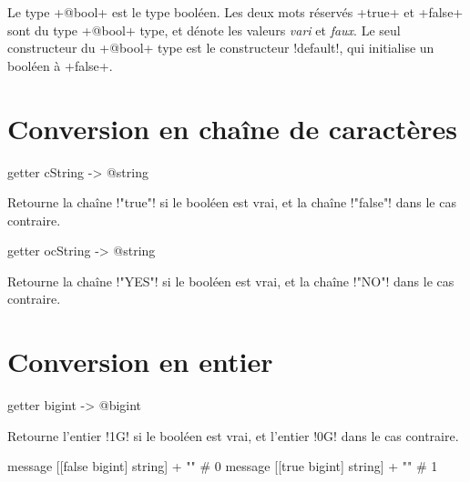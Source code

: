 



Le type \ggsq+@bool+ est le type booléen. Les deux mots réservés \ggsq+true+ et \ggsq+false+ sont du type \ggsq+@bool+ type, et dénote les valeurs \emph{vari} et \emph{faux}. Le seul constructeur du \ggsq+@bool+ type est le constructeur \ggsq!default!, qui initialise un booléen à \ggsq+false+.


\section{Conversion en chaîne de caractères}


\begin{galgas4box}
getter cString -> @string
\end{galgas4box}

Retourne la chaîne \ggsq!"true"! si le booléen est vrai, et la chaîne \ggsq!"false"! dans le cas contraire.








\begin{galgas4box}
getter ocString -> @string
\end{galgas4box}

Retourne la chaîne \ggsq!"YES"! si le booléen est vrai, et la chaîne \ggsq!"NO"! dans le cas contraire.




\section{Conversion en entier}



\begin{galgas4box}
getter bigint -> @bigint
\end{galgas4box}

Retourne l'entier \ggsq!1G! si le booléen est vrai, et l'entier \ggsq!0G! dans le cas contraire.

\begin{galgas4}
  message [[false bigint] string] + "\n" # 0
  message [[true bigint] string] + "\n" # 1
\end{galgas4}



